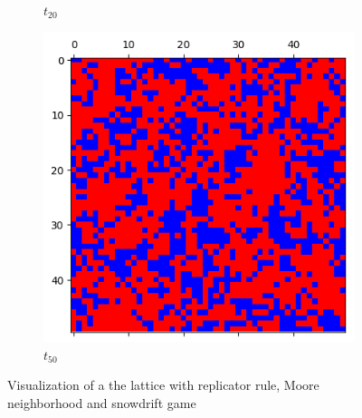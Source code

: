 \documentclass[letterpaper]{article}
\begin{document}
\begin{figure}
\begin{subfigure}{.3\textwidth}
      \caption{$t_{20}$}
      \label{fig:t20_50part2}
    \end{subfigure}
    \begin{subfigure}{.3\textwidth}
      \centering
      \includegraphics[width=1\linewidth]{images/assign2/visu_50-part2/t50}
      \caption{$t_{50}$}
      \label{fig:t50_50part2}
    \end{subfigure}
    \caption{Visualization of a the lattice with replicator rule,
    Moore neighborhood and snowdrift game}
    \label{fig:visu50part2}
\end{figure}
\end{document}

